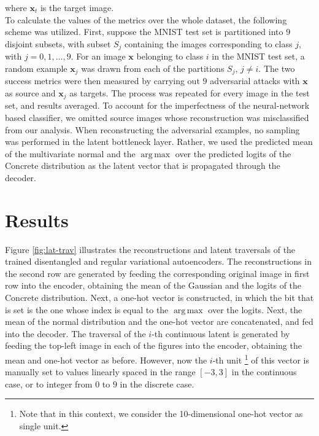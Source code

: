 \documentclass{report}
\DeclareMathOperator*{\argmax}{arg\,max}
\begin{document}
\noindent where $\boldsymbol{x}_t$ is the target image. \\

\noindent To calculate the values of the metrics over the whole dataset, the following scheme was utilized. First, suppose the MNIST test set is partitioned into 9 disjoint subsets, with subset $S_j$ containing the images corresponding to class $j$, with $j = 0, 1, \dots, 9$. For an image $\boldsymbol{x}$ belonging to class $i$ in the MNIST test set, a random example $\boldsymbol{x}_j$ was drawn from each of the partitions $S_j$, $j \neq i$. The two success metrics were then measured by carrying out $9$ adversarial attacks with $\boldsymbol{x}$ as source and $\boldsymbol{x}_j$ as targets. The process was repeated for every image in the test set, and results averaged. To account for the imperfectness of the neural-network based classifier, we omitted source images whose reconstruction was misclassified from our analysis. When reconstructing the adversarial examples, no sampling was performed in the latent bottleneck layer. Rather, we used the predicted mean of the multivariate normal and the $\argmax$ over the predicted logits of the Concrete distribution as the latent vector that is propagated through the decoder.

\chapter{Results}

Figure \ref{fig:lat-trav} illustrates the reconstructions and latent traversals of the trained disentangled and regular variational autoencoders. The reconstructions in the second row are generated by feeding the corresponding original image in first row into the encoder, obtaining the mean of the Gaussian and the logits of the Concrete distribution. Next, a one-hot vector is constructed, in which the bit that is set is the one whose index is equal to the $\argmax$ over the logits. Next, the mean of the normal distribution and the one-hot vector are concatenated, and fed into the decoder. The traversal of the $i$-th continuous latent is generated by feeding the top-left image in each of the figures into the encoder, obtaining the mean and one-hot vector as before. However, now the $i$-th unit \footnote{Note that in this context, we consider the 10-dimensional one-hot vector as single unit.} of this vector is manually set to values linearly spaced in the range $[-3, 3]$ in the continuous case, or to integer from $0$ to $9$ in the discrete case. \\
\end{document}
